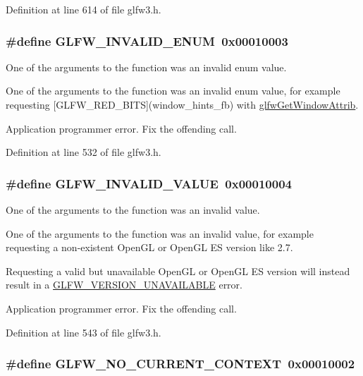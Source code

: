 Definition at line 614 of file glfw3.h.\hypertarget{group__errors_g76f6bb9c4eea73db675f096b404593ce}{
\subsubsection[GLFW\_\-INVALID\_\-ENUM]{\setlength{\rightskip}{0pt plus 5cm}\#define GLFW\_\-INVALID\_\-ENUM~0x00010003}}
\label{group__errors_g76f6bb9c4eea73db675f096b404593ce}


One of the arguments to the function was an invalid enum value. 

One of the arguments to the function was an invalid enum value, for example requesting \mbox{[}GLFW\_\-RED\_\-BITS\mbox{]}(window\_\-hints\_\-fb) with \hyperlink{group__window_g1bb0c7e100418e284dbb800789c63d40}{glfwGetWindowAttrib}.

Application programmer error. Fix the offending call. 

Definition at line 532 of file glfw3.h.\hypertarget{group__errors_gaf2ef9aa8202c2b82ac2d921e554c687}{
\subsubsection[GLFW\_\-INVALID\_\-VALUE]{\setlength{\rightskip}{0pt plus 5cm}\#define GLFW\_\-INVALID\_\-VALUE~0x00010004}}
\label{group__errors_gaf2ef9aa8202c2b82ac2d921e554c687}


One of the arguments to the function was an invalid value. 

One of the arguments to the function was an invalid value, for example requesting a non-existent OpenGL or OpenGL ES version like 2.7.

Requesting a valid but unavailable OpenGL or OpenGL ES version will instead result in a \hyperlink{group__errors_gd16c5565b4a69f9c2a9ac2c0dbc89462}{GLFW\_\-VERSION\_\-UNAVAILABLE} error.

Application programmer error. Fix the offending call. 

Definition at line 543 of file glfw3.h.\hypertarget{group__errors_ga8290386e9528ccb9e42a3a4e16fc0d0}{
\subsubsection[GLFW\_\-NO\_\-CURRENT\_\-CONTEXT]{\setlength{\rightskip}{0pt plus 5cm}\#define GLFW\_\-NO\_\-CURRENT\_\-CONTEXT~0x00010002}}
\label{group__errors_ga8290386e9528ccb9e42a3a4e16fc0d0}



